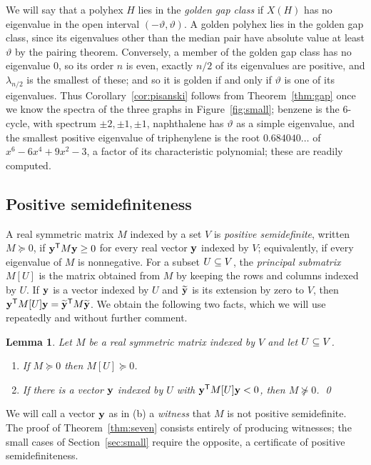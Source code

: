 \documentclass[11pt]{article}
\newcommand\thetaG{\vartheta}
\newcommand\tp{^{\mathsf T}}
\newtheorem{lemma}[theorem]{Lemma}
\theoremstyle{definition}
\begin{document}
We will say that a polyhex $H$ lies in the \textsl{golden gap class} if
$X(H)$ has no eigenvalue in the open interval $(-\thetaG,\thetaG)$.  A golden
polyhex lies in the golden gap class, since its eigenvalues other than the
median pair have absolute value at least $\thetaG$ by the
pairing theorem.  Conversely, a member of the golden gap class has no
eigenvalue $0$, so its order $n$ is even, exactly $n/2$ of its eigenvalues are
positive, and $\lambda_{n/2}$ is the smallest of these; and so it is golden
if and only if $\thetaG$ is one of its eigenvalues.  Thus
Corollary~\ref{cor:pisanski} follows from Theorem~\ref{thm:gap} once we know
the spectra of the three graphs in Figure~\ref{fig:small}; benzene is the
$6$-cycle, with spectrum $\pm2,\pm1,\pm1$, naphthalene has $\thetaG$ as a
simple eigenvalue, and the smallest positive eigenvalue of triphenylene is
the root $0.684040\ldots$ of $x^{6}-6x^{4}+9x^{2}-3$, a factor of its
characteristic polynomial; these are readily computed.

\subsection{Positive semidefiniteness}

A real symmetric matrix $M$ indexed by a set $V$ is \textsl{positive
semidefinite}, written $M\succeq0$, if $\Zy\tp M\Zy\ge0$ for every real
vector ${\mathbf y}$ indexed by $V$; equivalently, if every eigenvalue of $M$ is
nonnegative.  For a subset $U\subseteq V$, the \textsl{principal submatrix} $M[U]$
is the matrix obtained from $M$ by keeping the rows and columns indexed by
$U$.  If ${\mathbf y}$ is a vector indexed by $U$ and $\widetilde{{\mathbf y}}$ is its
extension by zero to $V$, then $\Zy\tp M[U]\Zy=\widetilde{\Zy}\tp M
\widetilde{\Zy}$.  We obtain the following two facts, which we will use
repeatedly and without further comment.

\begin{lemma}\label{lem:principal}
Let $M$ be a real symmetric matrix indexed by $V$ and let $U\subseteq V$.
\begin{enumerate}
\item[\textup{(a)}] If $M\succeq0$ then $M[U]\succeq0$.
\item[\textup{(b)}] If there is a vector ${\mathbf y}$ indexed by $U$ with
 $\Zy\tp M[U]\Zy<0$, then $M\not\succeq0$.  \qed
\end{enumerate}
\end{lemma}

We will call a vector ${\mathbf y}$ as in (b) a \textsl{witness} that $M$ is not
positive semidefinite.  The proof of Theorem~\ref{thm:seven} consists
entirely of producing witnesses; the small cases of
Section~\ref{sec:small} require the opposite, a certificate of positive
semidefiniteness.
\end{document}
